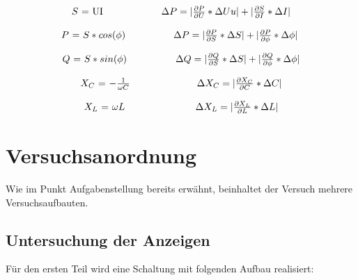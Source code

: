 \documentclass[12pt,a4paper,twoside]{article}
\begin{document}
\begin{equation}
    \label{eq:Scheinleistung}
    \centerline{$S $ = UI   \\ $\Delta P = \vert \frac{\partial P}{\partial U} * \Delta Uu \vert + \vert \frac{\partial S}{\partial I} * \Delta I \vert$}
\end{equation}

\begin{equation}
    \label{eq:Wirkleistung}
    \centerline{$P $ = $S*cos(\phi)$  \\ $\Delta P = \vert \frac{\partial P}{\partial S} * \Delta S \vert + \vert \frac{\partial P}{\partial \phi} * \Delta \phi \vert$ }
\end{equation}

\begin{equation}
    \label{eq:Blindleistung}
    \centerline{$Q $ = $S*sin(\phi)$  \\ $\Delta Q = \vert \frac{\partial Q}{\partial S} * \Delta S \vert + \vert \frac{\partial Q}{\partial \phi} * \Delta \phi \vert$}
\end{equation}

\begin{equation}
    \label{eq:ReaktanzenC}
    \centerline{$X_{C}$ = $-\frac{1}{\omega C}$ \\ $\Delta X_{C} = \vert \frac{\partial X_{C}}{\partial C} * \Delta C \vert $}
\end{equation}

\begin{equation}
    \label{eq:ReaktanzenL}
    \centerline{$X_{L}$ = $\omega L$ \\ $\Delta X_{L} = \vert \frac{\partial X_{L}}{\partial L} * \Delta L \vert $} 
\end{equation}



\section{Versuchsanordnung} %

Wie im Punkt Aufgabenstellung bereits erwähnt, beinhaltet der Versuch mehrere Versuchsaufbauten.

\subsection{Untersuchung der Anzeigen}

Für den ersten Teil wird eine Schaltung mit folgenden Aufbau realisiert:
\end{document}
